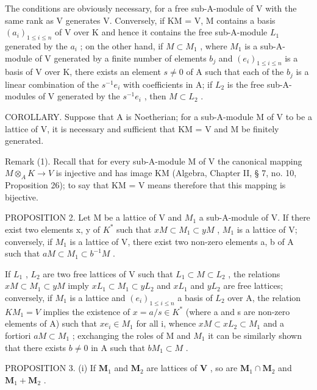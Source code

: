 The conditions are obviously necessary, for a free sub-A-module of V with the same rank as V generates V. Conversely, if KM = V, M contains a basis \((a_{i})_{1 \leqslant i \leqslant n}\) of V over K and hence it contains the free sub-A-module \(L_{1}\) generated by the \(a_{i}\) ; on the other hand, if \(M \subset M_{1}\) , where \(M_{1}\) is a sub-A-module of V generated by a finite number of elements \(b_{j}\) and \((e_{i})_{1 \leqslant i \leqslant n}\) is a basis of V over K, there exists an element \(s \neq 0\) of A such that each of the \(b_{j}\) is a linear combination of the \(s^{-1}e_{i}\) with coefficients in A; if \(L_{2}\) is the free sub-A-modules of V generated by the \(s^{-1}e_{i}\) , then \(M \subset L_{2}\) .

COROLLARY. Suppose that A is Noetherian; for a sub-A-module M of V to be a lattice of V, it is necessary and sufficient that KM = V and M be finitely generated.

Remark (1). Recall that for every sub-A-module M of V the canonical mapping \(M \otimes_{A} K \to V\) is injective and has image KM (Algebra, Chapter II, § 7, no. 10, Proposition 26); to say that KM = V means therefore that this mapping is bijective.

PROPOSITION 2. Let M be a lattice of V and \(M_{1}\) a sub-A-module of V. If there exist two elements x, y of \(K^{*}\) such that \(xM \subset M_{1} \subset yM\) , \(M_{1}\) is a lattice of V; conversely, if \(M_{1}\) is a lattice of V, there exist two non-zero elements a, b of A such that \(aM \subset M_{1} \subset b^{-1}M\) .

If \(L_{1}\) , \(L_{2}\) are two free lattices of V such that \(L_{1} \subset M \subset L_{2}\) , the relations \(xM \subset M_{1} \subset yM\) imply \(xL_{1} \subset M_{1} \subset yL_{2}\) and \(xL_{1}\) and \(yL_{2}\) are free lattices; conversely, if \(M_{1}\) is a lattice and \((e_{i})_{1 \leqslant i \leqslant n}\) a basis of \(L_{2}\) over A, the relation \(KM_{1} = V\) implies the existence of \(x = a/s \in K^{*}\) (where a and s are non-zero elements of A) such that \(xe_{i} \in M_{1}\) for all i, whence \(xM \subset xL_{2} \subset M_{1}\) and a fortiori \(aM \subset M_{1}\) ; exchanging the roles of M and \(M_{1}\) it can be similarly shown that there exists \(b \neq 0\) in A such that \(bM_{1} \subset M\) .

PROPOSITION 3. (i) If \(\mathbf{M}_1\) and \(\mathbf{M}_2\) are lattices of \(\mathbf{V}\) , so are \(\mathbf{M}_1 \cap \mathbf{M}_2\) and \(\mathbf{M}_1 + \mathbf{M}_2\) .

